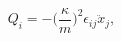 \begin{equation}
     Q_{i}=
     -\big(\frac{\kappa}{m}\big)^2\epsilon_{ij}\ddot{x}_{j},
     \label{intcoord}
\end{equation}

